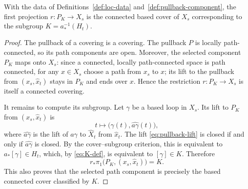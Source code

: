 \begin{lemma}\label{lem:pullback-subgroup}
With the data of Definitions~\ref{def:loc-data} and~\ref{def:pullback-component}, the first projection \( r\colon P_K\to X_s \) is the connected based cover of \( X_s \) corresponding to the subgroup \( K=a_*^{-1}(H_t) \).
\end{lemma}

\begin{proof}
The pullback of a covering is a covering.  The pullback \( P \) is locally path-connected, so its path components are open.  Moreover, the selected component \( P_K \) maps onto \( X_s \): since a connected, locally path-connected space is path connected, for any \( x\in X_s \) choose a path from \( x_s \) to \( x \); its lift to the pullback from \( (x_s,\widehat x_t) \) stays in \( P_K \) and ends over \( x \).  Hence the restriction \( r\colon P_K\to X_s \) is itself a connected covering.

It remains to compute its subgroup.  Let \( \gamma \) be a based loop in \( X_s \).  Its lift to \( P_K \) from \( (x_s,\widehat x_t) \) is
\begin{equation}\label{eq:pullback-lift}
  t\longmapsto\bigl(\gamma(t),\widehat{a\gamma}(t)\bigr),
\end{equation}
where \( \widehat{a\gamma} \) is the lift of \( a\gamma \) to \( \widehat X_t \) from \( \widehat x_t \).  The lift \eqref{eq:pullback-lift} is closed if and only if \( \widehat{a\gamma} \) is closed.  By the cover--subgroup criterion, this is equivalent to \( a_*[\gamma]\in H_t \), which, by \eqref{eq:K-def}, is equivalent to \( [\gamma]\in K \).  Therefore
\[
  r_*\pi_1\bigl(P_K,(x_s,\widehat x_t)\bigr)=K .
\]
This also proves that the selected path component is precisely the based connected cover classified by \( K \).
\end{proof}